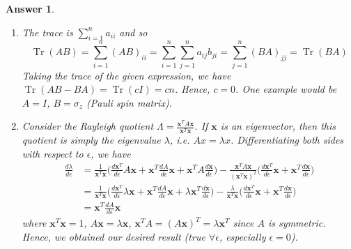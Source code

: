 \documentclass[a4paper]{article}
\DeclareMathOperator{\Tr}{Tr}
\newtheorem{ans}{Answer}[section]
\theoremstyle{new}
\begin{document}
\begin{ans}
\begin{enumerate}[label=(\alph*)]
For $Q_2$, we have $-y_1^2+y_2^2+y_3^2$ due to the eigenvalue of the $x_3$ direction now being $-6$ instead of $+6$.
\item The trace is $\sum_{i=1}^na_{ii}$ and so 
$$\Tr(AB)=\sum_{i=1}^n(AB)_{ii}=\sum_{i=1}^n\sum_{j=1}^na_{ij}b_{ji}=\sum_{j=1}^n(BA)_{jj}=\Tr(BA)$$
Taking the trace of the given expression, we have $\Tr(AB-BA)=\Tr(cI)=cn$. Hence, $c=0$. One example would be $A=I$, $B=\sigma_z$ (Pauli spin matrix).
\item Consider the Rayleigh quotient $\Lambda=\frac{\mathbf{x}^TA\mathbf{x}}{\mathbf{x}^T\mathbf{x}}$. If $\mathbf{x}$ is an eigenvector, then this quotient is simply the eigenvalue $\lambda$, i.e. $Ax=\lambda x$. Differentiating both sides with respect to $\epsilon$, we have
\begin{align}
\frac{d\lambda}{d\epsilon}&=\frac{1}{\mathbf{x}^T\mathbf{x}}\bigg(\frac{d\mathbf{x}^T}{d\epsilon}A\mathbf{x}+\mathbf{x}^T\frac{dA}{d\epsilon}\mathbf{x}+\mathbf{x}^TA\frac{d\mathbf{x}}{d\epsilon}\bigg)-\frac{\mathbf{x}^TA\mathbf{x}}{(\mathbf{x}^T\mathbf{x})^2}\bigg(\frac{d\mathbf{x}^T}{d\epsilon}\mathbf{x}+\mathbf{x}^T\frac{d\mathbf{x}}{d\epsilon}\bigg)\nonumber\\&=\frac{1}{\mathbf{x}^T\mathbf{x}}\bigg(\frac{d\mathbf{x}^T}{d\epsilon}\lambda\mathbf{x}+\mathbf{x}^T\frac{dA}{d\epsilon}\mathbf{x}+\lambda\mathbf{x}^T\frac{d\mathbf{x}}{d\epsilon}\bigg)-\frac{\lambda}{\mathbf{x}^T\mathbf{x}}\bigg(\frac{d\mathbf{x}^T}{d\epsilon}\mathbf{x}+\mathbf{x}^T\frac{d\mathbf{x}}{d\epsilon}\bigg)\nonumber\\&=\mathbf{x}^T\frac{dA}{d\epsilon}\mathbf{x}\nonumber
\end{align}
where $\mathbf{x}^T\mathbf{x}=1$, $A\mathbf{x}=\lambda\mathbf{x}$, $\mathbf{x}^TA=(A\mathbf{x})^T=\lambda\mathbf{x}^T$ since $A$ is symmetric. Hence, we obtained our desired result (true $\forall\epsilon$, especially $\epsilon=0$).
\end{enumerate}
\end{ans}
\newpage
\end{document}
